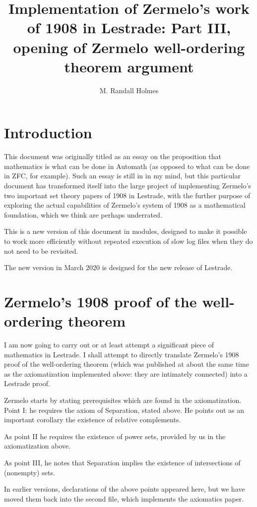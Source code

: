 \documentclass[12pt]{article}
\title{Implementation of Zermelo's work of 1908 in Lestrade:  Part III, opening of Zermelo well-ordering theorem argument}
\author{M. Randall Holmes}
\begin{document}
\maketitle

\section{Introduction}
 
This document was originally titled as an essay on the proposition that mathematics is what can be done in Automath (as opposed to what can be done in ZFC, for example).  Such an essay is still in in my mind, but this particular document has transformed itself into the large project of implementing Zermelo's two important set theory papers of 1908 in Lestrade, with the further purpose of exploring the actual capabilities of Zermelo's system of 1908 as a mathematical foundation, which we think are perhaps underrated.

This is a new version of this document in modules, designed to make it possible to work more efficiently without repeated execution of slow log files when they do not need to be revisited.

The new version in March 2020 is designed for the new release of Lestrade.

\section{Zermelo's 1908 proof of the well-ordering theorem}

I am now going to carry out or at least attempt a significant piece of mathematics in Lestrade.  I shall attempt to directly translate Zermelo's 1908 proof of the well-ordering theorem
(which was published at about the same time as the axiomatization implemented above:  they are intimately connected) into a Lestrade proof.

Zermelo starts by stating prerequisites which are found in the axiomatization.  Point I:  he requires the axiom of Separation, stated above.  He points out as an important corollary the existence of
relative complements.

As point II he requires the existence of power sets, provided by us in the axiomatization above. 

As point III, he notes that Separation implies the existence of intersections of (nonempty) sets.

In earlier versions, declarations of the above points appeared here, but we have moved them back into the second file, which implements the axiomatics paper.
\end{document}
